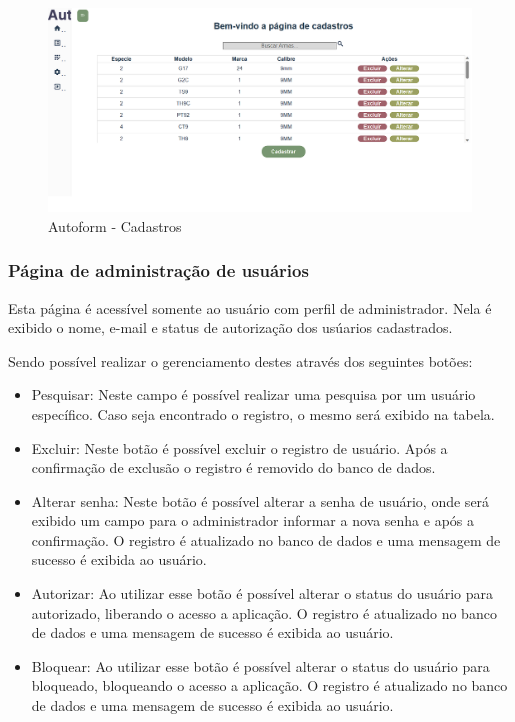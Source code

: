 \begin{figure}[H]
    \caption{\label{fig:tela-cadastros-armas}Autoform - Cadastros}
    \begin{center}
        \includegraphics[scale=0.5]{imagens/autoform-cadastros.png}
    \end{center}
\end{figure}

\subsubsection{Página de administração de usuários}
Esta página é acessível somente ao usuário com perfil de administrador.
Nela é exibido o nome, e-mail e status de autorização dos usúarios cadastrados.

Sendo possível realizar o gerenciamento destes através dos seguintes botões:
\begin{itemize}
    \item Pesquisar: Neste campo é possível realizar uma pesquisa por um usuário específico. Caso seja encontrado o registro, o mesmo será exibido na tabela.
    \item Excluir: Neste botão é possível excluir o registro de usuário. Após a confirmação de exclusão o registro é removido do banco de dados.
    \item Alterar senha: Neste botão é possível alterar a senha de usuário, onde será exibido um campo para o administrador informar a nova senha e após a confirmação. O registro é atualizado no banco de dados e uma mensagem de sucesso é exibida ao usuário.
    \item Autorizar: Ao utilizar esse botão é possível alterar o status do usuário para autorizado, liberando o acesso a aplicação. O registro é atualizado no banco de dados e uma mensagem de sucesso é exibida ao usuário.
    \item Bloquear: Ao utilizar esse botão é possível alterar o status do usuário para bloqueado, bloqueando o acesso a aplicação. O registro é atualizado no banco de dados e uma mensagem de sucesso é exibida ao usuário.
\end{itemize}

